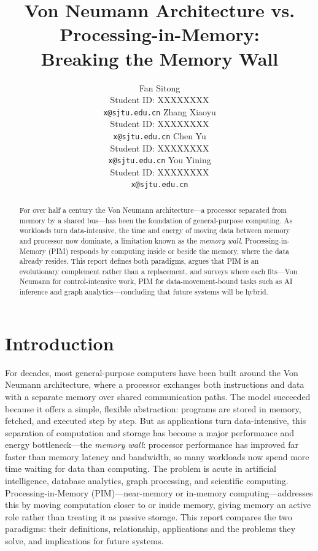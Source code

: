 \documentclass{article} %
\title{Von Neumann Architecture vs. Processing-in-Memory:\\ Breaking the Memory Wall}
\author{
Fan Sitong \\ Student ID: XXXXXXXX \\ \texttt{x@sjtu.edu.cn}
\And
Zhang Xiaoyu \\ Student ID: XXXXXXXX \\ \texttt{x@sjtu.edu.cn}
\AND
Chen Yu \\ Student ID: XXXXXXXX \\ \texttt{x@sjtu.edu.cn}
\And
You Yining \\ Student ID: XXXXXXXX \\ \texttt{x@sjtu.edu.cn}
}
\begin{document}
\maketitle

\begin{abstract}
For over half a century the Von Neumann architecture---a processor separated
from memory by a shared bus---has been the foundation of general-purpose
computing. As workloads turn data-intensive, the time and energy of moving data
between memory and processor now dominate, a limitation known as the
\emph{memory wall}. Processing-in-Memory (PIM) responds by computing inside or
beside the memory, where the data already resides. This report defines both
paradigms, argues that PIM is an evolutionary complement rather than a
replacement, and surveys where each fits---Von Neumann for control-intensive
work, PIM for data-movement-bound tasks such as AI inference and graph
analytics---concluding that future systems will be hybrid.
\end{abstract}

\section{Introduction}
For decades, most general-purpose computers have been built around the Von Neumann architecture, where a processor exchanges both instructions and data with a separate memory over shared communication paths. The model succeeded because it offers a simple, flexible abstraction: programs are stored in memory, fetched, and executed step by step. But as applications turn data-intensive, this separation of computation and storage has become a major performance and energy bottleneck---the \textit{memory wall}: processor performance has improved far faster than memory latency and bandwidth, so many workloads now spend more time waiting for data than computing. The problem is acute in artificial intelligence, database analytics, graph processing, and scientific computing. Processing-in-Memory (PIM)---near-memory or in-memory computing---addresses this by moving computation closer to or inside memory, giving memory an active role rather than treating it as passive storage. This report compares the two paradigms: their definitions, relationship, applications and the problems they solve, and implications for future systems.
\end{document}
